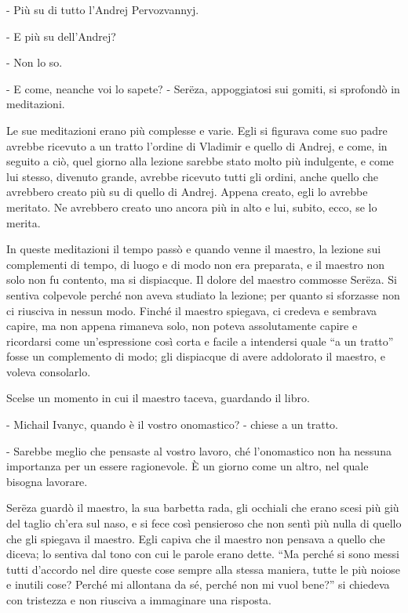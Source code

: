 - Più su di tutto l'Andrej Pervozvannyj. 

- E più su dell'Andrej? 

- Non lo so. 

- E come, neanche voi lo sapete? - Serëza, appoggiatosi sui gomiti, si sprofondò in meditazioni. 

Le sue meditazioni erano più complesse e varie. Egli si figurava come suo padre avrebbe ricevuto a un tratto l'ordine di Vladimir e quello di Andrej, e come, in seguito a ciò, quel giorno alla lezione sarebbe stato molto più indulgente, e come lui stesso, divenuto grande, avrebbe ricevuto tutti gli ordini, anche quello che avrebbero creato più su di quello di Andrej. Appena creato, egli lo avrebbe meritato. Ne avrebbero creato uno ancora più in alto e lui, subito, ecco, se lo merita. 

In queste meditazioni il tempo passò e quando venne il maestro, la lezione sui complementi di tempo, di luogo e di modo non era preparata, e il maestro non solo non fu contento, ma si dispiacque. Il dolore del maestro commosse Serëza. Si sentiva colpevole perché non aveva studiato la lezione; per quanto si sforzasse non ci riusciva in nessun modo. Finché il maestro spiegava, ci credeva e sembrava capire, ma non appena rimaneva solo, non poteva assolutamente capire e ricordarsi come un'espressione così corta e facile a intendersi quale ``a un tratto'' fosse un complemento di modo; gli dispiacque di avere addolorato il maestro, e voleva consolarlo. 

Scelse un momento in cui il maestro taceva, guardando il libro. 

- Michail Ivanyc, quando è il vostro onomastico? - chiese a un tratto. 

- Sarebbe meglio che pensaste al vostro lavoro, ché l'onomastico non ha nessuna importanza per un essere ragionevole. È un giorno come un altro, nel quale bisogna lavorare. 

Serëza guardò il maestro, la sua barbetta rada, gli occhiali che erano scesi più giù del taglio ch'era sul naso, e si fece così pensieroso che non sentì più nulla di quello che gli spiegava il maestro. Egli capiva che il maestro non pensava a quello che diceva; lo sentiva dal tono con cui le parole erano dette. ``Ma perché si sono messi tutti d'accordo nel dire queste cose sempre alla stessa maniera, tutte le più noiose e inutili cose? Perché mi allontana da sé, perché non mi vuol bene?'' si chiedeva con tristezza e non riusciva a immaginare una risposta. 

